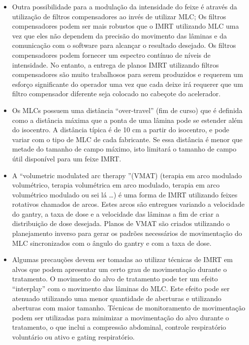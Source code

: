\documentclass[11pt,a4paper]{article}
\newcounter{exemplo}
\begin{document}
\begin{exemplo}
\begin{itemize}
        \item Outra possibilidade para a modulação da intensidade do feixe é através da utilização de filtros compensadores ao invés de utilizar MLC; Os filtros compensadores podem ser mais robustos que o IMRT utilizando MLC uma vez que eles não dependem da precisão do movimento das lâminas e da comunicação com o software para alcançar o resultado desejado. Os filtros compensadores podem fornecer um espectro contínuo de níveis de intensidade. No entanto, a entrega de planos IMRT utilizando filtros compensadores são muito trabalhosos para serem produzidos e requerem um esforço significante do operador uma vez que cada deixe irá requerer que um filtro compensador diferente seja colocado no cabeçote do acelerador. 
        
        \item Os MLCs possuem uma distância ``over-travel'' (fim de curso)  que é definida como a distância máxima que a ponta de uma lâmina pode se estender além do isocentro. A distância típica é de 10 cm a partir do isocentro, e pode variar com o tipo de MLC de cada fabricante. Se essa distância é menor que metade do tamanho de campo máximo, isto limitará o tamanho de campo útil disponível para um feixe IMRT. 

        \item A ``volumetric modulated arc therapy ''(VMAT) (terapia em arco modulado volumétrico, terapia volumétrica em arco modulado, terapia em arco volumétrico modulado ou sei lá \dots) é uma forma de IMRT utilizando feixes rotativos chamados de arcos. Estes arcos são entregues variando a velocidade do gantry, a taxa de dose e a velocidade das lâminas a fim de criar a distribuição de dose desejada. Planos de VMAT são criados utilizando o planejamento inverso para gerar os padrões necessários de movimentação do MLC sincronizados com o ângulo do gantry e com a taxa de dose.
        
        \item Algumas precauções devem ser tomadas ao utilizar técnicas de IMRT em alvos que podem apresentar um certo grau de movimentação durante o tratamento. O movimento do alvo de tratamento pode ter um efeito ``interplay'' com o movimento das lâminas do MLC. Este efeito pode ser atenuado utilizando uma menor quantidade de aberturas e utilizando aberturas com maior tamanho. Técnicas de monitoramento de movimentação podem ser utilizadas para minimizar a movimentação do alvo durante o tratamento, o que inclui a compressão abdominal, controle respiratório voluntário ou ativo e gating respiratório.
        

\end{itemize}
\end{exemplo}
\end{document}
